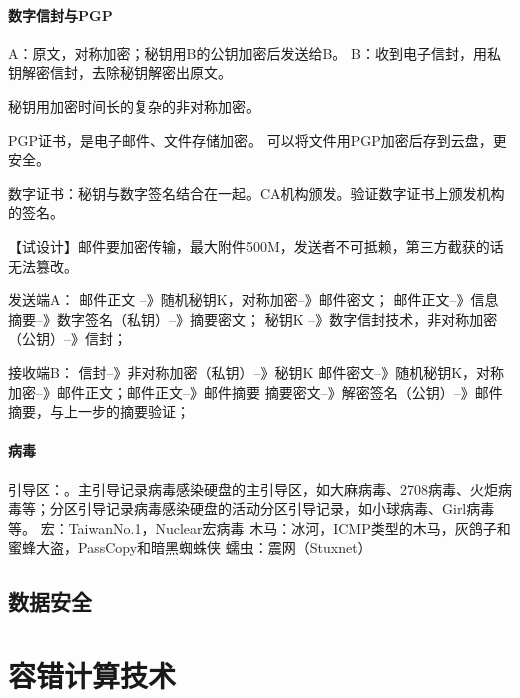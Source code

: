 \documentclass[UTF8]{../computerUniverse}
\begin{document}
\subsubsection{数字信封与PGP}
A：原文，对称加密；秘钥用B的公钥加密后发送给B。
B：收到电子信封，用私钥解密信封，去除秘钥解密出原文。

秘钥用加密时间长的复杂的非对称加密。

PGP证书，是电子邮件、文件存储加密。
可以将文件用PGP加密后存到云盘，更安全。

数字证书：秘钥与数字签名结合在一起。CA机构颁发。验证数字证书上颁发机构的签名。


【试设计】邮件要加密传输，最大附件500M，发送者不可抵赖，第三方截获的话无法篡改。

发送端A：
邮件正文 --》随机秘钥K，对称加密--》邮件密文；
邮件正文--》信息摘要--》数字签名（私钥）--》摘要密文；
秘钥K --》数字信封技术，非对称加密（公钥）--》信封；

接收端B：
信封--》非对称加密（私钥）--》秘钥K
邮件密文--》随机秘钥K，对称加密--》邮件正文；邮件正文--》邮件摘要
摘要密文--》解密签名（公钥）--》邮件摘要，与上一步的摘要验证；

\subsubsection{病毒}
引导区：。主引导记录病毒感染硬盘的主引导区，如大麻病毒、2708病毒、火炬病毒等；分区引导记录病毒感染硬盘的活动分区引导记录，如小球病毒、Girl病毒等。
宏：TaiwanNo.1，Nuclear宏病毒
木马：冰河，ICMP类型的木马，灰鸽子和蜜蜂大盗，PassCopy和暗黑蜘蛛侠
蠕虫：震网（Stuxnet）

\section{数据安全}


\chapter{容错计算技术}
\end{document}
